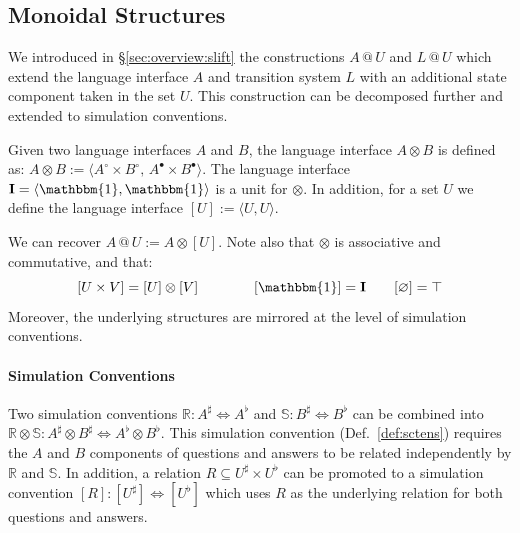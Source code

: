\documentclass[acmsmall,screen,review,anonymous]{acmart}
\newcommand{\que}{\circ}
\newcommand{\ans}{\bullet}
\begin{document}

\subsection{Monoidal Structures} %

We introduced in \S\ref{sec:overview:slift}
the constructions $A \mathbin@ U$ and $L \mathbin@ U$
which extend the language interface $A$ and transition system $L$
with an additional state component taken in the set $U$.
This construction can be decomposed further
and extended to simulation conventions.

\begin{definition} %
Given two language interfaces $A$ and $B$,
the language interface $A \otimes B$ is defined as:
$
  A \otimes B :=
    \langle A^\que \times B^\que, \,
            A^\ans \times B^\ans \rangle
$.
The language interface
$\mathbf{I} = \langle \mathbbm{1}, \mathbbm{1} \rangle$
is a unit for $\otimes$.
In addition, for a set $U$
we define the language interface
$[U] := \langle U, U \rangle$.
\end{definition}

We can recover
$A \mathbin@ U := A \otimes [U]$.
Note also that $\otimes$ is %
associative and commutative,
and that:
\[
  [U \times V] = [U] \otimes [V]
  \qquad \qquad
  [\mathbbm{1}] = \mathbf{I}
  \qquad
  [\varnothing] = \top
\]
Moreover,
the underlying structures
are mirrored at the level of simulation conventions.

\paragraph{Simulation Conventions} %

Two simulation conventions
$\mathbb{R} : A^\sharp \Leftrightarrow A^\flat$ and
$\mathbb{S} : B^\sharp \Leftrightarrow B^\flat$
can be combined into %
$
  \mathbb{R} \otimes \mathbb{S} :
  A^\sharp \otimes B^\sharp \Leftrightarrow
  A^\flat \otimes B^\flat
$.
This simulation convention
(Def.~\ref{def:sctens})
requires the $A$ and $B$ components
of questions and answers
to be related independently by $\mathbb{R}$ and $\mathbb{S}$.
In addition,
a relation $R \subseteq U^\sharp \times U^\flat$
can be promoted to a simulation convention
$
  [R] : [U^\sharp] \Leftrightarrow [U^\flat]
$
which uses $R$ as the underlying relation for both
questions and answers.
\end{document}
